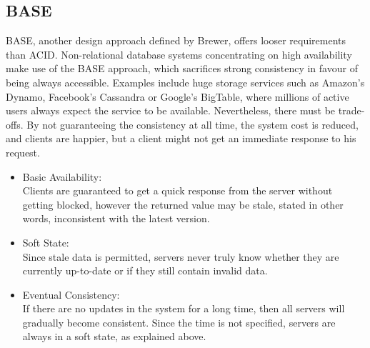 \subsection{BASE}
\label{sec:background_base}
BASE, another design approach defined by Brewer, offers looser requirements than ACID\cite{brewer2012cap}. Non-relational database systems concentrating on high availability make use of the BASE approach, which sacrifices strong consistency in favour of being always accessible. Examples include huge storage services such as Amazon's Dynamo, Facebook's Cassandra or Google's BigTable, where millions of active users always expect the service to be available\cite{kalid2017big}. Nevertheless, there must be trade-offs. By not guaranteeing the consistency at all time, the system cost is reduced, and clients are happier, but a client might not get an immediate response to his request.

\begin{itemize}
  \item Basic Availability:\\
 Clients are guaranteed to get a quick response from the server without getting blocked, however the returned value may be stale, stated in other words, inconsistent with the latest version.
  \item Soft State:\\
Since stale data is permitted, servers never truly know whether they are currently up-to-date or if they still contain invalid data.
  \item Eventual Consistency:\\
If there are no updates in the system for a long time, then all servers will gradually become consistent. Since the time is not specified, servers are always in a soft state, as explained above.
\end{itemize}

    

